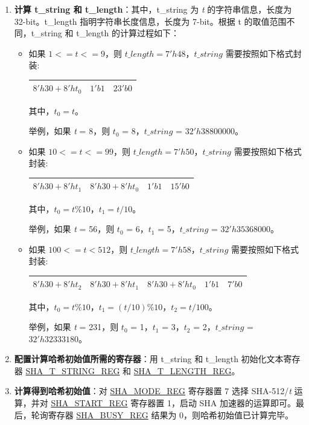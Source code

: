 \documentclass[main\_\_CN.tex]{subfiles}
\begin{document}
\begin{enumerate}\label{others:sha-512/t}
    \item \textbf{计算 t\_string 和 t\_length}：其中，t\_string 为 {\it{t}} 的字符串信息，长度为 32-bit。t\_length 指明字符串长度信息，长度为 7-bit。根据 t 的取值范围不同，t\_string 和 t\_length 的计算过程如下：

    \begin{itemize}
        \item 如果 $1<=t<=9$，则 $t\_length=7'h48$，$t\_string$ 需要按照如下格式封装:\\
        \begin{longtable}[c]{|l|l|l|}
        \hline
        $8'h30+8'ht_0$ & $1'b1$ & $23'b0$\\
        \hline
        \end{longtable}
        其中，$t_0=t$。

        举例，如果 {\it{t}} = 8，则 $t_0$ = 8，$t\_string$ = $32'h38800000$。

        \item 如果 $10<=t<=99$，则 $t\_length=7'h50$，$t\_string$ 需要按照如下格式封装:\\

        \begin{longtable}[c]{|l|l|l|l|}
        \hline
        $8'h30+8'ht_1$ & $8'h30+8'ht_0$ & $1'b1$ & $15'b0$\\
        \hline
        \end{longtable}
        其中，$t_0=t\%10$，$t_1=t/10$。

        举例，如果 {\it{t}} = 56，则 $t_0$ = 6，$t_1$ = 5，$t\_string$ = $32'h35368000$。

        \item 如果 $100<=t<512$，则 $t\_length=7'h58$，$t\_string$ 需要按照如下格式封装:\\

        \begin{longtable}[c]{|l|l|l|l|l|}
        \hline
        $8'h30+8'ht_2$ & $8'h30+8'ht_1$ & $8'h30+8'ht_0$ & $1'b1$ & $7'b0$\\
        \hline
        \end{longtable}
        其中，$t_0=t\%10$，$t_1=(t/10)\%10$，$t_2=t/100$。

        举例，如果 {\it{t}} = 231，则 $t_0$ = 1，$t_1$ = 3，$t_2$ = 2，$t\_string$ = $32'h32333180$。

    \end{itemize}
    \item \textbf{配置计算哈希初始值所需的寄存器}：用 t\_string 和 t\_length 初始化文本寄存器 \hyperref[regdesc:SHATSTRINGREG]{SHA\_T\_STRING\_REG} 和  \hyperref[regdesc:SHATLENGTHREG]{SHA\_T\_LENGTH\_REG}。

    \item \textbf{计算得到哈希初始值}：对 \hyperref[regdesc:SHAMODEREG]{SHA\_MODE\_REG} 寄存器置 7 选择 SHA-512/{\it{t}} 运算，并对 \hyperref[regdesc:SHASTARTREG]{SHA\_START\_REG} 寄存器置 1，启动 SHA 加速器的运算即可。最后，轮询寄存器 \hyperref[regdesc:SHABUSYREG]{SHA\_BUSY\_REG} 结果为 0，则哈希初始值已计算完毕。
\end{enumerate}
\end{document}
